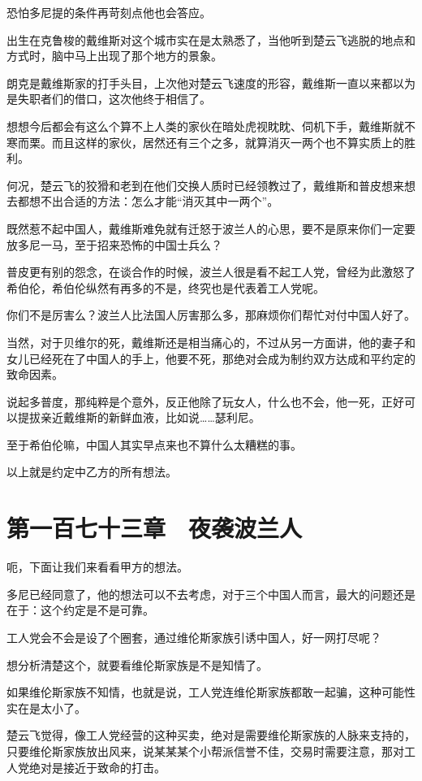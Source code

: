 恐怕多尼提的条件再苛刻点他也会答应。

出生在克鲁梭的戴维斯对这个城市实在是太熟悉了，当他听到楚云飞逃脱的地点和方式时，脑中马上出现了那个地方的景象。

朗克是戴维斯家的打手头目，上次他对楚云飞速度的形容，戴维斯一直以来都以为是失职者们的借口，这次他终于相信了。

想想今后都会有这么个算不上人类的家伙在暗处虎视眈眈、伺机下手，戴维斯就不寒而栗。而且这样的家伙，居然还有三个之多，就算消灭一两个也不算实质上的胜利。

何况，楚云飞的狡猾和老到在他们交换人质时已经领教过了，戴维斯和普皮想来想去都想不出合适的方法：怎么才能“消灭其中一两个”。

既然惹不起中国人，戴维斯难免就有迁怒于波兰人的心思，要不是原来你们一定要放多尼一马，至于招来恐怖的中国士兵么？

普皮更有别的怨念，在谈合作的时候，波兰人很是看不起工人党，曾经为此激怒了希伯伦，希伯伦纵然有再多的不是，终究也是代表着工人党呢。

你们不是厉害么？波兰人比法国人厉害那么多，那麻烦你们帮忙对付中国人好了。

当然，对于贝维尔的死，戴维斯还是相当痛心的，不过从另一方面讲，他的妻子和女儿已经死在了中国人的手上，他要不死，那绝对会成为制约双方达成和平约定的致命因素。

说起多普度，那纯粹是个意外，反正他除了玩女人，什么也不会，他一死，正好可以提拔亲近戴维斯的新鲜血液，比如说……瑟利尼。

至于希伯伦嘛，中国人其实早点来也不算什么太糟糕的事。

以上就是约定中乙方的所有想法。

\section{第一百七十三章　夜袭波兰人}

呃，下面让我们来看看甲方的想法。

多尼已经同意了，他的想法可以不去考虑，对于三个中国人而言，最大的问题还是在于：这个约定是不是可靠。

工人党会不会是设了个圈套，通过维伦斯家族引诱中国人，好一网打尽呢？

想分析清楚这个，就要看维伦斯家族是不是知情了。

如果维伦斯家族不知情，也就是说，工人党连维伦斯家族都敢一起骗，这种可能性实在是太小了。

楚云飞觉得，像工人党经营的这种买卖，绝对是需要维伦斯家族的人脉来支持的，只要维伦斯家族放出风来，说某某某个小帮派信誉不佳，交易时需要注意，那对工人党绝对是接近于致命的打击。

